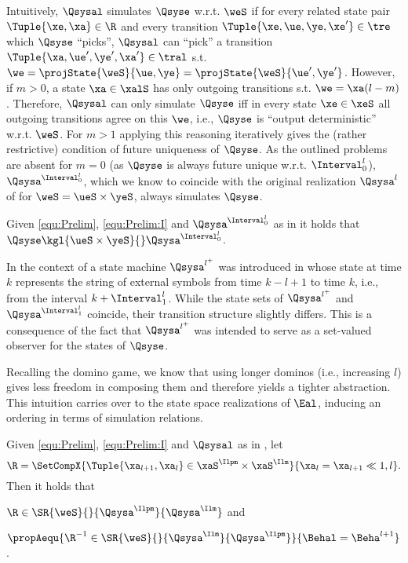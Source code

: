 Intuitively, $\Qsysal$ simulates $\Qsyse$ w.r.t. $\weS$ if for every related state pair $\Tuple{\xe,\xa}\in\R$ and every transition $\Tuple{\xe,\ue,\ye,\xe'}\in\tre$ which $\Qsyse$ \enquote{picks}, $\Qsysal$ can \enquote{pick} a transition $\Tuple{\xa,\ue',\ye',\xa'}\in\tral$ s.t. $\we=\projState{\weS}{\ue,\ye}=\projState{\weS}{\ue',\ye'}$. However, if $m>0$, a state $\xa\in\xalS$ has only outgoing transitions s.t. $\we=\xa(l-m)$. Therefore, $\Qsysal$ can only simulate $\Qsyse$ iff in every state $\xe\in\xeS$ all outgoing transitions agree on this $\we$, i.e., $\Qsyse$ is \enquote{output deterministic} w.r.t. $\weS$. For $m>1$ applying this reasoning iteratively gives the (rather restrictive) condition of future uniqueness of $\Qsyse$.
As the outlined problems are absent for $m=0$ (as $\Qsyse$ is always future unique w.r.t. $\Interval^l_0$), $\Qsysa^{\Interval^l_0}$, which we know to coincide with the original realization $\Qsysa^l$ of \SAlA for $\weS=\ueS\times\yeS$, always simulates $\Qsyse$.

\begin{corollary}
 Given \eqref{equ:Prelim}, \eqref{equ:Prelim:I} and $\Qsysa^{\Interval^l_0}$ as in  it holds that 
$\Qsyse\kgl{\ueS\times\yeS}{}\Qsysa^{\Interval^l_0}$.
\end{corollary}

 \begin{remark}
 In the context of \SlA a state machine $\Qsysa^{l^+}$ was introduced in \cite{Raisch2010} whose state at time $k$ represents the string of external symbols from time $k-l+1$ to time $k$, i.e., from the interval $k+\Interval^l_1$. While the state sets of  $\Qsysa^{l^+}$ and $\Qsysa^{\Interval^l_1}$ coincide, their transition structure slightly differs. This is a consequence of the fact that $\Qsysa^{l^+}$ was intended to serve as a set-valued observer for the states of $\Qsyse$.
\end{remark}
  
Recalling the domino game, we know that using longer dominos (i.e., increasing $l$) gives less freedom in composing them and therefore yields a tighter abstraction. This intuition carries over to the state space realizations of $\Eal$, inducing an ordering in terms of simulation relations. 

\begin{theorem}\label{thm:SimRel_QsysalpmQsysalm}
Given \eqref{equ:Prelim}, \eqref{equ:Prelim:I} and $\Qsysal$ as in , let
\begin{equation}\label{equ:R_l}
  \R=\SetCompX{\Tuple{\xa_{l+1},\xa_l}\in\xaS^{{\Ilpm}}\times\xaS^{{\Ilm}}}{
  \xa_{l}=\xa_{l+1}\ll{1,l}}.
 \end{equation}
Then it holds that 
 \begin{compactenum}[(i)]
  \item $\R\in\SR{\weS}{}{\Qsysa^{\Ilpm}}{\Qsysa^{\Ilm}}$ and 
  \item $\propAequ{\R^{-1}\in\SR{\weS}{}{\Qsysa^{\Ilm}}{\Qsysa^{\Ilpm}}}{\Behal=\Beha^{l+1} }$.
 \end{compactenum}
\end{theorem}

